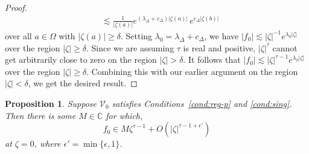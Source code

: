 \documentclass{article}
\theoremstyle{definition}
\theoremstyle{plain}
\newtheorem{proposition}{Proposition}
\newcommand{\C}{\mathbb{C}}
\newcommand{\hardpart}{\mathcal{V}_0}
\newcommand{\solproto}{f_0}
\newcommand{\domain}{\Omega}
\begin{document}
\begin{proof}
\begin{align*}
& \lesssim \frac{1}{|\zeta(a)|} e^{(\lambda_\Delta + c_\Delta)|\zeta(a)|}\,e^{c_\Delta|\zeta(b)|}
\end{align*}
over all $a \in \domain$ with $|\zeta(a)| \ge \delta$. Setting $\lambda_0 = \lambda_\Delta + c_\Delta$, we have $|\solproto| \lesssim |\zeta|^{-1} e^{\lambda_0|\zeta|}$ over the region $|\zeta| \ge \delta$. Since we are assuming $\tau$ is real and positive, $|\zeta|^\tau$ cannot get arbitrarily close to zero on the region $|\zeta| > \delta$. It follows that $|\solproto| \lesssim |\zeta|^{\tau-1} e^{\lambda_0|\zeta|}$ over the region $|\zeta| \ge \delta$. Combining this with our earlier argument on the region $|\zeta| < \delta$, we get the desired result.
\end{proof}
\begin{proposition}\label{prop:better-proto-estimate}
Suppose $\hardpart$ satisfies {\em Conditions~\eqref{cond:reg-p}} and \eqref{cond:sing}. Then there is some $M\in\C$ for which,
\[ \solproto \in M\zeta^{\tau-1} + O(|\zeta|^{\tau-1+\epsilon'}) \]
at $\zeta = 0$, where $\epsilon'=\min\{\epsilon, 1\}$.
\end{proposition}
\end{document}

